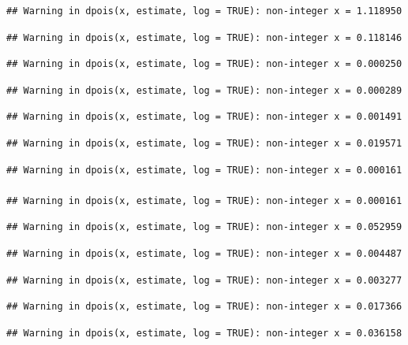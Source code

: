 \documentclass[]{article}
\begin{document}
\begin{verbatim}
## Warning in dpois(x, estimate, log = TRUE): non-integer x = 1.118950
\end{verbatim}

\begin{verbatim}
## Warning in dpois(x, estimate, log = TRUE): non-integer x = 0.118146
\end{verbatim}

\begin{verbatim}
## Warning in dpois(x, estimate, log = TRUE): non-integer x = 0.000250
\end{verbatim}

\begin{verbatim}
## Warning in dpois(x, estimate, log = TRUE): non-integer x = 0.000289
\end{verbatim}

\begin{verbatim}
## Warning in dpois(x, estimate, log = TRUE): non-integer x = 0.001491
\end{verbatim}

\begin{verbatim}
## Warning in dpois(x, estimate, log = TRUE): non-integer x = 0.019571
\end{verbatim}

\begin{verbatim}
## Warning in dpois(x, estimate, log = TRUE): non-integer x = 0.000161

## Warning in dpois(x, estimate, log = TRUE): non-integer x = 0.000161
\end{verbatim}

\begin{verbatim}
## Warning in dpois(x, estimate, log = TRUE): non-integer x = 0.052959
\end{verbatim}

\begin{verbatim}
## Warning in dpois(x, estimate, log = TRUE): non-integer x = 0.004487
\end{verbatim}

\begin{verbatim}
## Warning in dpois(x, estimate, log = TRUE): non-integer x = 0.003277
\end{verbatim}

\begin{verbatim}
## Warning in dpois(x, estimate, log = TRUE): non-integer x = 0.017366
\end{verbatim}

\begin{verbatim}
## Warning in dpois(x, estimate, log = TRUE): non-integer x = 0.036158
\end{verbatim}
\end{document}
